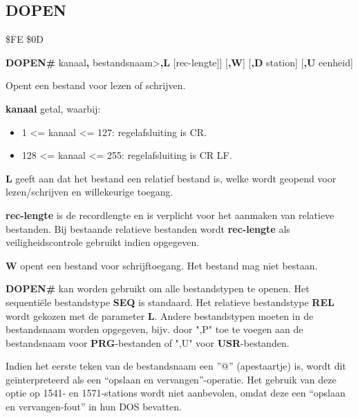 \newpage
\subsection{DOPEN}
\begin{description}[leftmargin=2cm,style=nextline]
\item [Token:]    \$FE \$0D
\item [Formaat:]   {\bf DOPEN\#} kanaal{\bf,} bestandsnaam>{\bf,L} [rec-lengte]] [{\bf,W}] [{\bf,D} station] [{\bf,U} eenheid]\item [Gebruik:]    Opent een bestand voor lezen of schrijven.

{\bf kanaal} getal, waarbij:
                  \begin{itemize}
                     \item 1 <= kanaal <= 127: regelafsluiting is CR.                     \item 128 <= kanaal <= 255: regelafsluiting is CR LF.
                  \end{itemize}

                  {\bf L} geeft aan dat het bestand een relatief bestand is, welke wordt geopend voor lezen/schrijven en willekeurige toegang.

                  {\bf rec-lengte} is de recordlengte en is verplicht voor het aanmaken van relatieve bestanden. Bij bestaande relatieve bestanden wordt {\bf rec-lengte} als veiligheidscontrole gebruikt indien opgegeven.

                  {\bf W} opent een bestand voor schrijftoegang. Het bestand mag niet bestaan.

                  \filenamedefinition

                  \drivedefinition

                  \unitdefinition

\item [Opmerkingen:]  {\bf DOPEN\#} kan worden gebruikt om alle bestandstypen te openen. Het sequentiële bestandstype {\bf SEQ} is standaard. Het relatieve bestandstype {\bf REL} wordt gekozen met de parameter {\bf L}. Andere bestandstypen moeten in de bestandsnaam worden opgegeven, bijv. door ",P" toe te voegen aan de bestandsnaam voor {\bf PRG}-bestanden of ",U" voor {\bf USR}-bestanden.

                  Indien het eerste teken van de bestandsnaam een ''@'' (apestaartje) is, wordt dit geïnterpreteerd als een ``opslaan en vervangen''-operatie. Het gebruik van deze optie op 1541- en 1571-stations wordt niet aanbevolen, omdat deze een ``opslaan en vervangen-fout'' in hun DOS bevatten.


\end{description}
